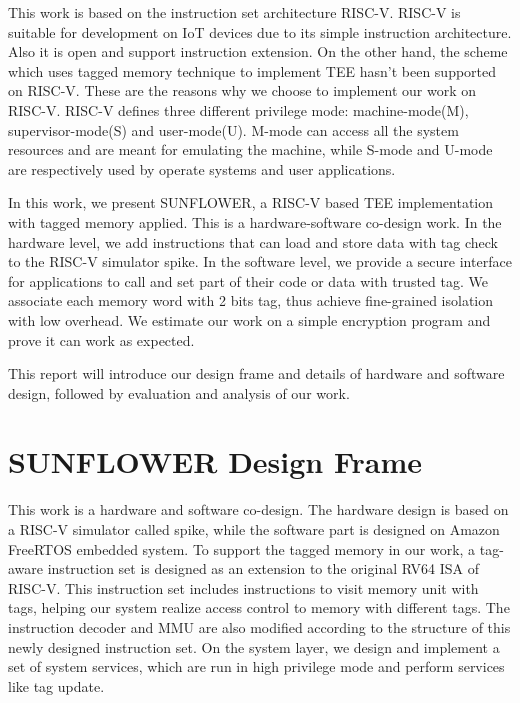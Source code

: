\documentclass[conference]{IEEEtran}
\begin{document}
This work is based on the instruction set architecture RISC-V.\cite{RISCV} RISC-V is suitable for development on IoT devices due to its simple instruction architecture. Also it is open and support instruction extension. On the other hand, the scheme which uses tagged memory technique to implement TEE hasn't been supported on RISC-V. These are the reasons why we choose to implement our work on RISC-V. RISC-V defines three different privilege mode: machine-mode(M), supervisor-mode(S) and user-mode(U). M-mode can access all the system resources and are meant for emulating the machine, while S-mode and U-mode are respectively used by operate systems and user applications.

In this work, we present SUNFLOWER, a RISC-V based TEE implementation with tagged memory applied. This is a hardware-software co-design work. In the hardware level, we add instructions that can load and store data with tag check to the RISC-V simulator spike. In the software level, we provide a secure interface for applications to call and set part of their code or data with trusted tag. We associate each memory word with 2 bits tag, thus achieve fine-grained isolation with low overhead. We estimate our work on a simple encryption program and prove it can work as expected. 

This report will introduce our design frame and details of hardware and software design, followed by evaluation and analysis of our work.



\section{SUNFLOWER Design Frame}
This work is a hardware and software co-design. The hardware design is based on a RISC-V simulator called spike, while the software part is designed on Amazon FreeRTOS embedded system. To support the tagged memory in our work, a tag-aware instruction set is designed as an extension to the original RV64 ISA of RISC-V. This instruction set includes instructions to visit memory unit with tags, helping our system realize access control to memory with different tags. The instruction decoder and MMU are also modified according to the structure of this newly designed instruction set. On the system layer, we design and implement a set of system services, which are run in high privilege mode and perform services like tag update.


\end{document}

